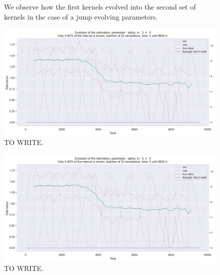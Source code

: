 \begin{figure}
\centering
{} 
\caption{We observe how the first kernels evolved into the second set of kernels in the case of a jump evolving parameters.}
\label{fig:compar_kernels_2}
\end{figure}

\begin{figure}
\centering
\includegraphics[width = 0.90 \textwidth]{../imag/chap3/2/Figure_2.png}
\caption{TO WRITE.}
\label{fig:first_estimate_2_alpha}
\end{figure}

\begin{figure}
\centering
\includegraphics[width = 0.90 \textwidth]{../imag/chap3/2/Figure_2.png}
\caption{TO WRITE.}
\label{fig:first_estimate_2_beta}
\end{figure}

